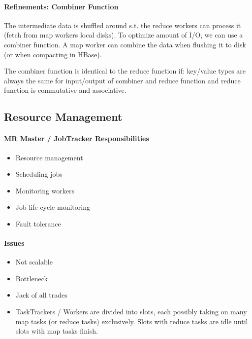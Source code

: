 \paragraph{Refinements: Combiner Function}
The intermediate data is shuffled around s.t. the reduce workers can process it (fetch from map workers local disks). To optimize amount of I/O, we can use a combiner function. A map worker can combine the data when flushing it to disk (or when compacting in HBase).

The combiner function is identical to the reduce function if: key/value types are always the same for input/output of combiner and reduce function and reduce function is commutative and associative.









\subsection{Resource Management}

\paragraph{MR Master / JobTracker Responsibilities}
\begin{itemize}
    \item Resource management
    \item Scheduling jobs
    \item Monitoring workers
    \item Job life cycle monitoring
    \item Fault tolerance
\end{itemize}

\paragraph{Issues}
\begin{itemize}
    \item Not scalable
    \item Bottleneck
    \item Jack of all trades
    \item TaskTrackers / Workers are divided into slots, each possibly taking on many map tasks (or reduce tasks) exclusively. Slots with reduce tasks are idle until slots with map tasks finish.
\end{itemize}

